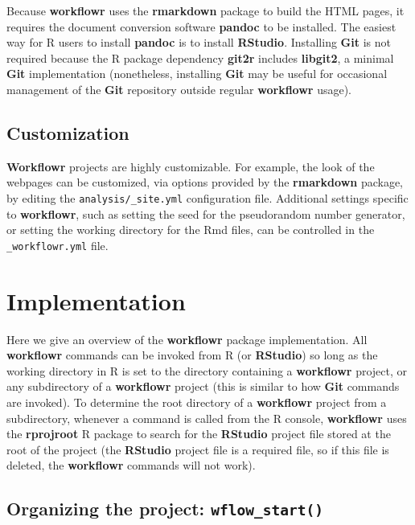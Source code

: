 \documentclass[9pt,a4paper]{extarticle}
\begin{document}
Because \textbf{workflowr} uses the \textbf{rmarkdown} package to build the HTML pages, it
requires the document conversion software \textbf{pandoc} to be installed. The
easiest way for R users to install \textbf{pandoc} is to install \textbf{RStudio}.
Installing \textbf{Git} is not required because the R package dependency \textbf{git2r}
includes \textbf{libgit2}, a minimal \textbf{Git} implementation (nonetheless, installing
 \textbf{Git} may be useful for occasional management of the \textbf{Git} repository
outside regular \textbf{workflowr} usage).

\subsection*{Customization}

 \textbf{Workflowr} projects are highly customizable. For example, the look of the
webpages can be customized, via options provided by the \textbf{rmarkdown}
package, by editing the \texttt{analysis/\_site.yml} configuration file.
Additional settings specific to \textbf{workflowr}, such as setting the seed for
the pseudorandom number generator, or setting the working directory for
the Rmd files, can be controlled in the \texttt{\_workflowr.yml} file.


\section*{Implementation}

Here we give an overview of the \textbf{workflowr} package implementation. All \textbf{workflowr} commands can be invoked from R (or \textbf{RStudio}) so long as the working directory in R is set to the directory containing a \textbf{workflowr} project, or any subdirectory of a \textbf{workflowr} project (this is similar to how \textbf{Git} commands are invoked). To determine the root directory of a \textbf{workflowr} project from a subdirectory, whenever a command is called from the R console, \textbf{workflowr} uses the \textbf{rprojroot} \cite{rprojroot} R package to search for the \textbf{RStudio} project file stored at the root of the project (the \textbf{RStudio} project file is a required file, so if this file is deleted, the \textbf{workflowr} commands will not work).

\subsection*{Organizing the project: \texttt{wflow\_start()}}
\end{document}
